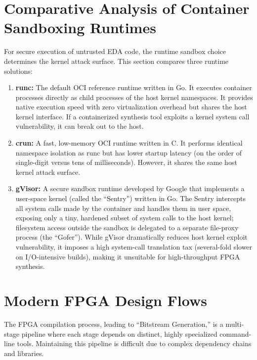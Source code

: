 \section{Comparative Analysis of Container Sandboxing Runtimes}
For secure execution of untrusted EDA code, the runtime sandbox choice determines the kernel attack surface. This section compares three runtime solutions:
\begin{enumerate}
    \item \textbf{runc:} The default OCI reference runtime written in Go. It executes container processes directly as child processes of the host kernel namespaces. It provides native execution speed with zero virtualization overhead but shares the host kernel interface. If a containerized synthesis tool exploits a kernel system call vulnerability, it can break out to the host.
    \item \textbf{crun:} A fast, low-memory OCI runtime written in C. It performs identical namespace isolation as runc but has lower startup latency (on the order of single-digit versus tens of milliseconds). However, it shares the same host kernel attack surface.
    \item \textbf{gVisor:} A secure sandbox runtime developed by Google that implements a user-space kernel (called the ``Sentry'') written in Go. The Sentry intercepts all system calls made by the container and handles them in user space, exposing only a tiny, hardened subset of system calls to the host kernel; filesystem access outside the sandbox is delegated to a separate file-proxy process (the ``Gofer''). While gVisor dramatically reduces host kernel exploit vulnerability, it imposes a high system-call translation tax (several-fold slower on I/O-intensive builds), making it unsuitable for high-throughput FPGA synthesis.
\end{enumerate}

\section{Modern FPGA Design Flows}
The FPGA compilation process, leading to ``Bitstream Generation,'' is a multi-stage pipeline where each stage depends on distinct, highly specialized command-line tools. Maintaining this pipeline is difficult due to complex dependency chains and libraries.

